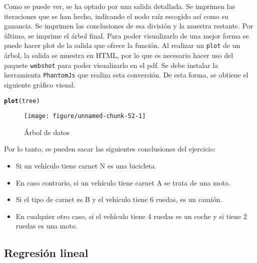 \documentclass[12pt]{report}\usepackage[]{graphicx}\usepackage[dvipsnames]{xcolor}
\makeatletter
\def\maxwidth{ %
  \ifdim\Gin@nat@width>\linewidth
    \linewidth
  \else
    \Gin@nat@width
  \fi
}
\newcommand{\hlstd}[1]{\textcolor[rgb]{0.345,0.345,0.345}{#1}}%
\newcommand{\hlkwd}[1]{\textcolor[rgb]{0.737,0.353,0.396}{\textbf{#1}}}%
\newenvironment{kframe}{%
 \def\at@end@of@kframe{}%
 \ifinner\ifhmode%
  \def\at@end@of@kframe{\end{minipage}}%
  \begin{minipage}{\columnwidth}%
 \fi\fi%
 \def\FrameCommand##1{\hskip\@totalleftmargin \hskip-\fboxsep
 \colorbox{shadecolor}{##1}\hskip-\fboxsep
     \hskip-\linewidth \hskip-\@totalleftmargin \hskip\columnwidth}%
 \MakeFramed {\advance\hsize-\width
   \@totalleftmargin\z@ \linewidth\hsize
   \@setminipage}}%
 {\par\unskip\endMakeFramed%
 \at@end@of@kframe}
\newenvironment{knitrout}{}{} %
\makeatother
\begin{document}
	 			Como se puede ver, se ha optado por una salida detallada. Se imprimen las iteraciones que se han hecho, indicando el nodo raíz escogido así como su ganancia. Se imprimen las conclusiones de esa división y la muestra restante. Por último, se imprime el árbol final. Para poder visualizarlo de una mejor forma se puede hacer plot de la salida que ofrece la función. Al realizar un \texttt{plot} de un árbol, la salida se muestra en HTML, por lo que es necesario hacer uso del paquete \texttt{webshot} para poder visualizarlo en el pdf. Se debe instalar la herramienta \texttt{PhantomJs} que realiza esta conversión. De esta forma, se obtiene el siguiente gráfico visual.
	 			
\begin{knitrout}
\color{fgcolor}\begin{kframe}
\begin{alltt}
\hlkwd{plot}\hlstd{(tree)}
\end{alltt}
\end{kframe}\begin{figure}[H]

{\centering \texttt{[image: figure/unnamed-chunk-52-1]} 

}

\caption[Árbol de datos]{Árbol de datos}\label{fig:unnamed-chunk-52}
\end{figure}

\end{knitrout}
	 			
	 			Por lo tanto, se pueden sacar las siguientes conclusiones del ejercicio:
	 			
	 			\begin{itemize}
	 				\item Si un vehículo tiene carnet N es una bicicleta.
	 				\item En caso contrario, si un vehículo tiene carnet A se trata de una moto.
	 				\item Si el tipo de carnet es B y el vehículo tiene 6 ruedas, es un camión.
	 				\item En cualquier otro caso, si el vehículo tiene 4 ruedas es un coche y si tiene 2 ruedas es una moto.
	 			\end{itemize}				
 			
 			\subsection{Regresión lineal}
 			
\end{document}
